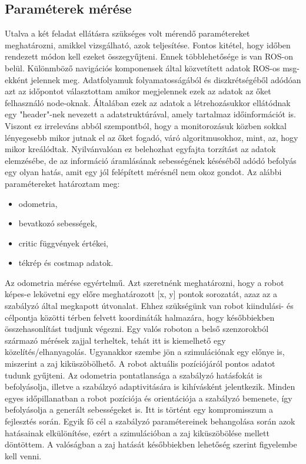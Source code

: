 \subsection{Paraméterek mérése}
Utalva a két feladat ellátásra szükséges volt mérendő paramétereket meghatározni, amikkel vizsgálható, azok teljesítése. Fontos kitétel, hogy időben rendezett módon kell ezeket összegyűjteni. Ennek többlehetősége is van ROS-on belül. Különmböző navigációs komponensek által közvetített adatok ROS-os msg-ekként jelennek meg. Adatfolyamuk folyamatosságából és diszkrétségéből adódóan azt az időpontot választottam amikor megjelennek ezek az adatok az őket felhasználó node-oknak. Általában ezek az adatok a létrehozásukkor ellátódnak egy "header"-nek nevezett a adatstruktúrával, amely tartalmaz időinformációt is. Viszont ez irreleváns abból szempontból, hogy a monitorozásuk közben sokkal lényegesebb mikor jutnak el az őket fogadó, váró algoritmusokhoz, mint, az, hogy mikor kreálódtak. Nyilvánvalóan ez belehozhat egyfajta torzítást az adatok elemzésébe, de az információ áramlásának sebességének késéséből adódó befolyás egy olyan hatás, amit egy jól felépített mérésnél nem okoz gondot. Az alábbi paramétereket határoztam meg:

\begin{itemize}
    \item odometria,
    \item bevatkozó sebességek,
    \item critic függvények értékei,
    \item tékrép és costmap adatok.
\end{itemize}

Az odometria mérése egyértelmű. Azt szeretnénk meghatározni, hogy a robot képes-e lekövetni egy előre meghatározott [x, y] pontok sorozatát, azaz az a szabályzó által megkapott útvonalat. Ehhez szükségünk van robot kiindulási- és célpontja közötti térben felvett koordináták halmazára, hogy későbbiekben összehasonlítást tudjunk végezni. Egy valós roboton a belső szenzorokból származó mérések zajjal terheltek, tehát itt is kiemelhető egy közelítés/elhanyagolás. Ugyanakkor szembe jön a szimulációnak egy előnye is, miszerint a zaj kiküszöbölhető. A robot aktuális pozíciójáról pontos adatot tudunk gyűjteni. Az odometria pontatlansága a szabályzó hatásfokát is befolyásolja, illetve a szabálzyó adaptivitására is kihívásként jelentkezik. Minden egyes időpillanatban a robot pozíciója és orientációja a szabályzó bemenete, így befolyásolja a generált sebességeket is. Itt is történt egy kompromisszum a fejlesztés során. Egyik fő cél a szabályzó paramétereinek behangolása során azok hatásainak elkülönítése, ezért a szimulációban a zaj kiküszöbölése mellett döntöttem. A valóságban a zaj hatását későbbiekben lehetőség szerint figyelembe kell venni.

